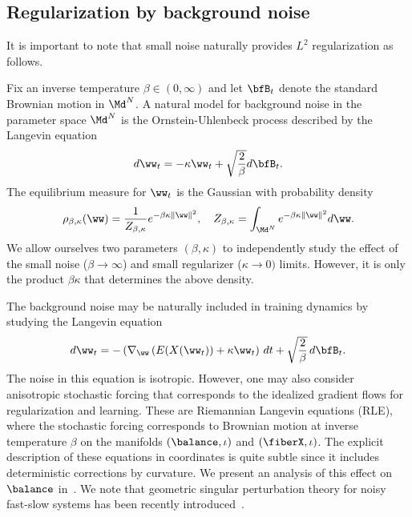 
\subsection{Regularization by background noise} \label{subsec:noise}
It is important to note that small noise naturally provides $L^2$ regularization as follows.

Fix an inverse temperature $\beta \in (0,\infty)$ and let $\bfB_t$ denote the standard Brownian motion in $\Md^N$. A natural model for background noise in the parameter space $\Md^N$ is the Ornstein-Uhlenbeck process described by the Langevin equation 
\begin{equation}
    \label{eq:fast-slow2}
    d\ww_t = -\kappa \ww_t + \sqrt{\frac{2}{\beta}} d\bfB_t.
\end{equation}
The equilibrium measure for $\ww_t$ is the Gaussian with probability density
\begin{equation}
    \label{eq:fast-slow3}
    \rho_{\beta,\kappa} (\ww) = \frac{1}{Z_{\beta,\kappa}} e^{-\beta\kappa \|\ww\|^2}, \quad Z_{\beta,\kappa} = \int_{\Md^N} e^{-\beta\kappa \|\ww\|^2} d\ww.
\end{equation}
We allow ourselves two parameters $(\beta,\kappa)$ to independently study the effect of the small noise ($\beta \to \infty$) and small regularizer ($\kappa\to 0)$ limits. However, it is only the product $\beta\kappa$ that determines the above density. 

The background noise may be naturally included in training dynamics by studying the Langevin equation
\begin{equation}
    \label{eq:fast-slow4}
    d{\ww}_t = -\left( \nabla_\ww \left( E(X(\ww_t)\right)+ \kappa \ww_t \right)\,dt  + \sqrt{\frac{2}{\beta}}\, d\bfB_t.
\end{equation}
The noise in this equation is isotropic. However, one may also consider anisotropic stochastic forcing that corresponds to the idealized gradient flows for regularization 
and learning. These are Riemannian Langevin equations (RLE),
where the stochastic forcing corresponds to Brownian motion at inverse temperature $\beta$ on the manifolds $(\balance,\iota)$ and $(\fiberX,\iota)$. The explicit description of these equations in coordinates is quite subtle since it includes deterministic corrections by curvature. We present an analysis of this effect on $\balance$ in~\cite{MY-RLE}.  We note that geometric singular perturbation theory for noisy fast-slow systems has been recently introduced~\cite{Kuehn}. 

